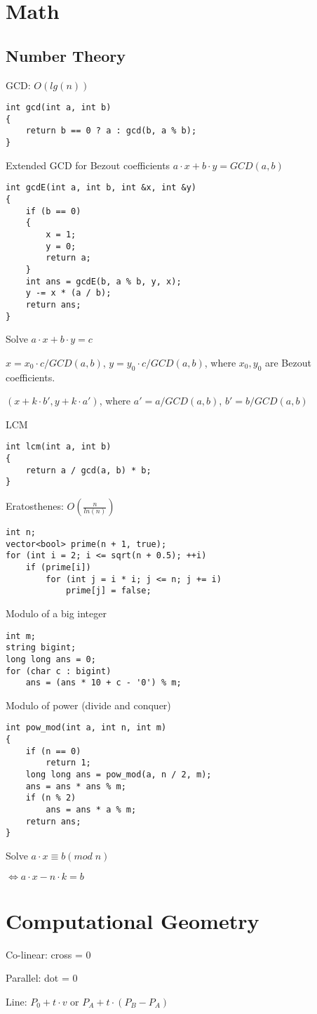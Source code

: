 \documentclass[10pt]{article}
\begin{document}
    \section*{Math}
    \subsection*{Number Theory}
    GCD: $O(lg(n))$
    \begin{lstlisting}
int gcd(int a, int b)
{
    return b == 0 ? a : gcd(b, a % b);
}
    \end{lstlisting}
    \bigskip

    Extended GCD for Bezout coefficients $a\cdot x + b\cdot y = GCD(a, b)$
    \begin{lstlisting}
int gcdE(int a, int b, int &x, int &y)
{
    if (b == 0)
    {
        x = 1;
        y = 0;
        return a;
    }
    int ans = gcdE(b, a % b, y, x);
    y -= x * (a / b);
    return ans;
}
\end{lstlisting}

    Solve $a\cdot x + b\cdot y = c$
    
    $x = x_0\cdot c / GCD(a, b)$, $y = y_0\cdot c / GCD(a, b)$, where $x_0, y_0$ are Bezout coefficients.

    $(x + k\cdot b', y + k\cdot a')$, where $a' = a/GCD(a, b)$, $b' = b/GCD(a, b)$
    \bigskip

    LCM
    \begin{lstlisting}
int lcm(int a, int b)
{
    return a / gcd(a, b) * b;
}
    \end{lstlisting}
    \bigskip

    Eratosthenes: $O(\frac{n}{ln(n)})$
    \begin{lstlisting}
int n;
vector<bool> prime(n + 1, true);
for (int i = 2; i <= sqrt(n + 0.5); ++i)
    if (prime[i])  
        for (int j = i * i; j <= n; j += i)
            prime[j] = false;
    \end{lstlisting}
    \bigskip

    Modulo of a big integer
    \begin{lstlisting}
int m;
string bigint;
long long ans = 0;
for (char c : bigint)
    ans = (ans * 10 + c - '0') % m;
    \end{lstlisting}
    \bigskip

    Modulo of power (divide and conquer)
    \begin{lstlisting}
int pow_mod(int a, int n, int m)
{
    if (n == 0)
        return 1;
    long long ans = pow_mod(a, n / 2, m);
    ans = ans * ans % m;
    if (n % 2)
        ans = ans * a % m;
    return ans;
}
    \end{lstlisting}
    \bigskip

    Solve $a\cdot x \equiv b (mod\; n)$

    $\iff a\cdot x - n\cdot k = b$

    \newpage
    \section*{Computational Geometry}
    Co-linear: cross = 0

    Parallel: dot = 0

    Line: $P_0 + t\cdot v$ or $P_A + t\cdot (P_B - P_A)$

    
\end{document}

